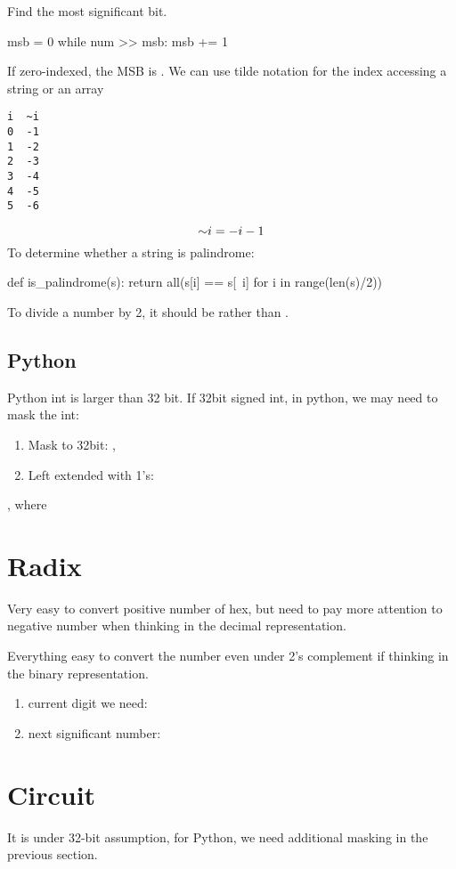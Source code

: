  Find the most significant bit. 
\begin{python}
msb = 0
while num >> msb:
  msb += 1
\end{python}
If zero-indexed, the MSB is .
 We can use tilde notation for the index accessing a string or an array
\begin{lstlisting}
i  ~i  
0  -1
1  -2
2  -3
3  -4 
4  -5 
5  -6
\end{lstlisting}
$$
\mathord{\sim} i = -i-1
$$
To determine whether a string is palindrome:
\begin{python}
def is_palindrome(s):
  return all(s[i] == s[~i] for i in range(len(s)/2)) 
\end{python}

 To divide a number by 2, it should be  rather than . 

\subsection{Python}
Python int is larger than 32 bit. 
If 32bit signed int, in python, we may need to mask the int:
\begin{enumerate}
\item Mask to 32bit: , 
\item Left extended with 1's: 
\end{enumerate}

, where 

\section{Radix}
 Very easy to convert positive number of hex, but need to pay more attention to negative number when thinking in the decimal representation. 

Everything easy to convert the number even under 2's complement if thinking in the binary representation. 
\begin{enumerate}
\item current digit we need: 
\item next significant number: 
\end{enumerate}
\section{Circuit}
It is under 32-bit assumption, for Python, we need additional masking in the previous section. 

